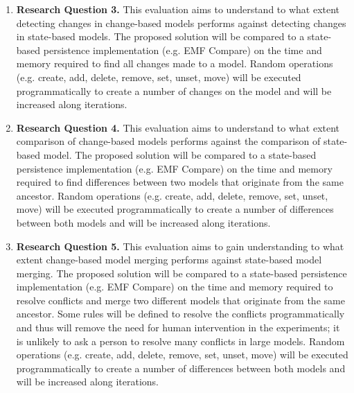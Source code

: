 \documentclass[12pt, a4paper]{report} \usepackage[titletoc]{appendix}
\begin{document}
\begin{enumerate}
    \item \textbf{Research Question 3.} This evaluation aims to understand to what extent detecting changes in change-based models performs against detecting changes in state-based models. The proposed solution will be compared to a state-based persistence implementation (e.g. EMF Compare) on the time and memory required to find all changes made to a model. Random operations (e.g. create, add, delete, remove, set, unset, move) will be executed programmatically to create a number of changes on the model and will be increased along iterations. 
    
    \item \textbf{Research Question 4.} This evaluation aims to understand to what extent comparison of change-based models performs against the comparison of state-based model. The proposed solution will be compared to a state-based persistence implementation (e.g. EMF Compare) on the time and memory required to find differences between two models that originate from the same ancestor. Random operations (e.g. create, add, delete, remove, set, unset, move) will be executed programmatically to create a number of differences between both models and will be increased along iterations. 
    
    \item \textbf{Research Question 5.} This evaluation aims to gain understanding to what extent change-based model merging performs against state-based model merging. The proposed solution will be compared to a state-based persistence implementation (e.g. EMF Compare) on the time and memory required to resolve conflicts and merge two different models that originate from the same ancestor. Some rules will be defined to resolve the conflicts programmatically and thus will remove the need for human intervention in the experiments; it is unlikely to ask a person to resolve many conflicts in large models. Random operations (e.g. create, add, delete, remove, set, unset, move) will be executed programmatically to create a number of differences between both models and will be increased along iterations. 
\end{enumerate}
\end{document}
